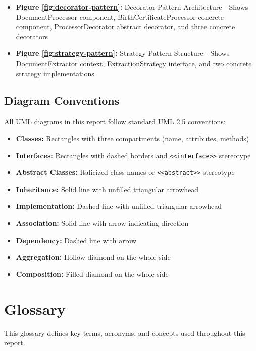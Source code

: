 \documentclass[11pt, a4paper]{article}
\theoremstyle{plain}
\theoremstyle{definition}
\begin{document}
\begin{itemize}
    \item \textbf{Figure \ref{fig:decorator-pattern}:} Decorator Pattern Architecture - Shows DocumentProcessor component, BirthCertificateProcessor concrete component, ProcessorDecorator abstract decorator, and three concrete decorators
    
    \item \textbf{Figure \ref{fig:strategy-pattern}:} Strategy Pattern Structure - Shows DocumentExtractor context, ExtractionStrategy interface, and two concrete strategy implementations
\end{itemize}

\subsection{Diagram Conventions}

All UML diagrams in this report follow standard UML 2.5 conventions:

\begin{itemize}
    \item \textbf{Classes:} Rectangles with three compartments (name, attributes, methods)
    \item \textbf{Interfaces:} Rectangles with dashed borders and \texttt{<<interface>>} stereotype
    \item \textbf{Abstract Classes:} Italicized class names or \texttt{<<abstract>>} stereotype
    \item \textbf{Inheritance:} Solid line with unfilled triangular arrowhead
    \item \textbf{Implementation:} Dashed line with unfilled triangular arrowhead
    \item \textbf{Association:} Solid line with arrow indicating direction
    \item \textbf{Dependency:} Dashed line with arrow
    \item \textbf{Aggregation:} Hollow diamond on the whole side
    \item \textbf{Composition:} Filled diamond on the whole side
\end{itemize}

\section{Glossary}

This glossary defines key terms, acronyms, and concepts used throughout this report.
\end{document}
